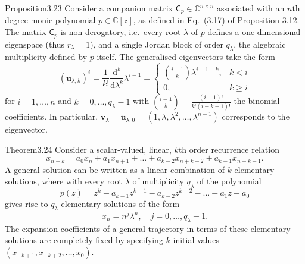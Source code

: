 \begin{res}{Proposition}{3.23}
Consider a companion matrix $\mathsf C_p\in\mathbb C^{n\times n}$ associated with an $n$th degree monic polynomial $p\in\mathbb C[z]$, as defined in Eq.~(3.17) of Proposition 3.12. The matrix $\mathsf C_p$ is non-derogatory, i.e.\ every root $\lambda$ of $p$ defines a one-dimensional eigenspace (thus $r_\lambda=1$), and a single Jordan block of order $q_\lambda$, the algebraic multiplicity defined by $p$ itself. The generalised eigenvectors take the form
\begin{equation}(\boldsymbol u_{\lambda,k})^i=\frac1{k!}\frac{\mathrm d^k}{\mathrm d\lambda^k}\lambda^{i-1}=\begin{cases}\binom{i-1}{k}\lambda^{i-1-k},&k<i\\0,&k\ge i\end{cases}\tag{3.58}\end{equation}
for $i=1,\dots,n$ and $k=0,\dots,q_\lambda-1$ with $\binom{i-1}{k}=\frac{(i-1)!}{k!(i-k-1)!}$ the binomial coefficients. In particular, $\boldsymbol v_\lambda=\boldsymbol u_{\lambda,0}=(1,\lambda,\lambda^2,\dots,\lambda^{n-1})$ corresponds to the eigenvector.
\end{res}

\begin{res}{Theorem}{3.24}
Consider a scalar-valued, linear, $k$th order recurrence relation
\begin{equation}x_{n+k}=a_0x_n+a_1x_{n+1}+\dots+a_{k-2}x_{n+k-2}+a_{k-1}x_{n+k-1}.\tag{3.85}\end{equation}
A general solution can be written as a linear combination of $k$ elementary solutions, where with every root $\lambda$ of multiplicity $q_\lambda$ of the polynomial
\begin{equation}p(z)=z^k-a_{k-1}z^{k-1}-a_{k-2}z^{k-2}-\dots-a_1z-a_0\tag{3.86}\end{equation}
gives rise to $q_\lambda$ elementary solutions of the form
\begin{equation}x_n=n^j\lambda^n,\quad j=0,\dots,q_\lambda-1.\tag{3.87}\end{equation}
The expansion coefficients of a general trajectory in terms of these elementary solutions are completely fixed by specifying $k$ initial values $(x_{-k+1},x_{-k+2},\dots,x_0)$.
\end{res}

